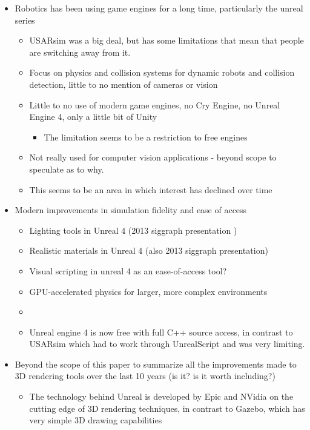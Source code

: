 \begin{itemize}
\item Robotics has been using game engines for a long time, particularly the unreal series
	\begin{itemize}
	\item USARsim was a big deal, but has some limitations that mean that people are switching away from it.
	\item Focus on physics and collision systems for dynamic robots and collision detection, little to no mention of cameras or vision
	\item Little to no use of modern game engines, no Cry Engine, no Unreal Engine 4, only a little bit of Unity
	\begin{itemize}
	    \item The limitation seems to be a restriction to free engines
	\end{itemize}
	\item Not really used for computer vision applications - beyond scope to speculate as to why.
	\item This seems to be an area in which interest has declined over time
	\end{itemize}

\item Modern improvements in simulation fidelity and ease of access
	\begin{itemize}
	\item Lighting tools in Unreal 4 (2013 siggraph presentation
	)
	\item Realistic materials in Unreal 4 (also 2013 siggraph presentation)
	\item Visual scripting in unreal 4 as an ease-of-access tool?
	\item GPU-accelerated physics for larger, more complex environments
	\item 
	\item Unreal engine 4 is now free with full C++ source access, in contrast to USARsim which had to work through UnrealScript and was very limiting.
	\end{itemize}
\item Beyond the scope of this paper to summarize all the improvements made to 3D rendering tools over the last 10 years (is it? is it worth including?)
	\begin{itemize}
	\item The technology behind Unreal is developed by Epic and NVidia on the cutting edge of 3D rendering techniques, in contrast to Gazebo, which has very simple 3D drawing capabilities
	\end{itemize}
\end{itemize}

